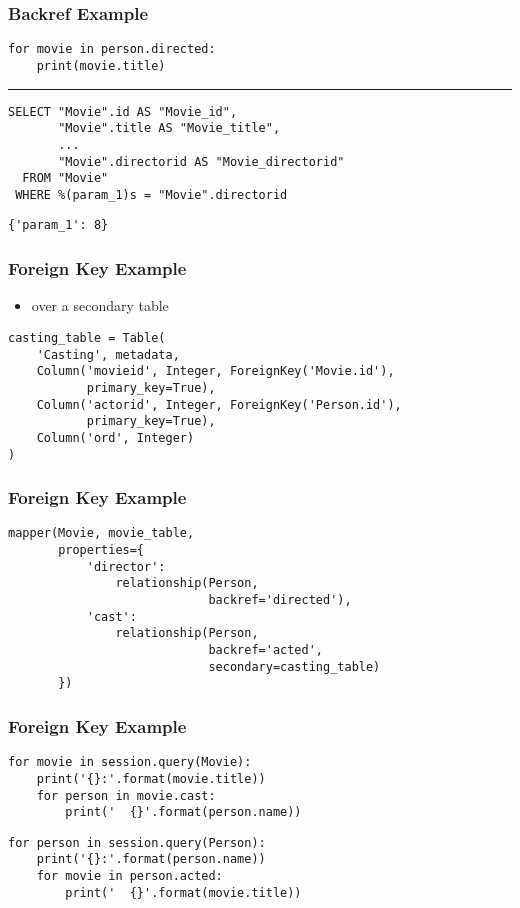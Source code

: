 \documentclass[dvipsnames]{beamer}
\theoremstyle{plain}
\begin{document}
\begin{frame}[fragile]
  \frametitle{Backref Example}

  \begin{lstlisting}
for movie in person.directed:
    print(movie.title)
  \end{lstlisting}
  \hrule

  \begin{lstlisting}[language=FullSQL]
SELECT "Movie".id AS "Movie_id",
       "Movie".title AS "Movie_title",
       ...
       "Movie".directorid AS "Movie_directorid"
  FROM "Movie"
 WHERE %(param_1)s = "Movie".directorid
  \end{lstlisting}

  \begin{lstlisting}
{'param_1': 8}
  \end{lstlisting}
\end{frame}

\begin{frame}[fragile]
  \frametitle{Foreign Key Example}

  \begin{itemize}
    \item over a secondary table
  \end{itemize}

  \begin{lstlisting}
casting_table = Table(
    'Casting', metadata,
    Column('movieid', Integer, ForeignKey('Movie.id'),
           primary_key=True),
    Column('actorid', Integer, ForeignKey('Person.id'),
           primary_key=True),
    Column('ord', Integer)
)
  \end{lstlisting}
\end{frame}

\begin{frame}[fragile]
  \frametitle{Foreign Key Example}

  \begin{lstlisting}
mapper(Movie, movie_table,
       properties={
           'director':
               relationship(Person,
                            backref='directed'),
           'cast':
               relationship(Person,
                            backref='acted',
                            secondary=casting_table)
       })
  \end{lstlisting}
\end{frame}

\begin{frame}[fragile]
  \frametitle{Foreign Key Example}

  \begin{lstlisting}
for movie in session.query(Movie):
    print('{}:'.format(movie.title))
    for person in movie.cast:
        print('  {}'.format(person.name))
  \end{lstlisting}

  \pause
  \begin{lstlisting}
for person in session.query(Person):
    print('{}:'.format(person.name))
    for movie in person.acted:
        print('  {}'.format(movie.title))
  \end{lstlisting}
\end{frame}
\end{document}
